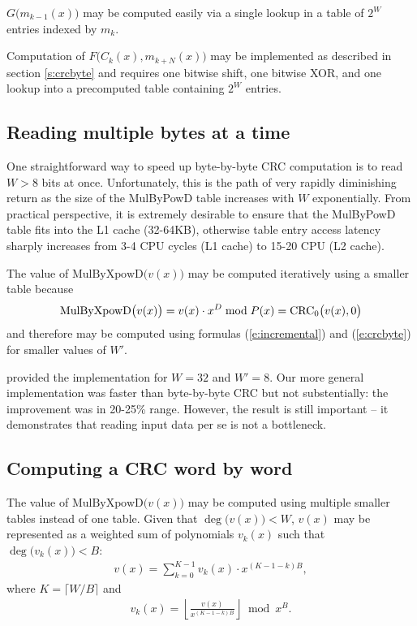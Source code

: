 \documentclass{article}
\begin{document}
$G\bigl(m_{k-1}(x)\bigr)$ may be computed easily via a single lookup
in a table of $2^W$ entries indexed by $m_k$.

Computation of $F\bigl(C_k(x), m_{k+N}(x)\bigr)$ may be implemented as
described in section \ref{s:crcbyte} and requires one bitwise shift, one
bitwise XOR, and one lookup into a precomputed table containing $2^W$
entries.


\subsection{Reading multiple bytes at a time} \label{s:crcbyteword}

One straightforward way to speed up byte-by-byte CRC computation is to read
$W > 8$ bits at once. Unfortunately, this is the path of very rapidly
diminishing return as the size of the MulByPowD table increases with $W$
exponentially. From practical perspective, it is extremely desirable to
ensure that the MulByPowD table fits into the L1 cache (32-64KB), otherwise
table entry access latency sharply increases from 3-4 CPU cycles (L1 cache)
to 15-20 CPU (L2 cache).

The value of $\mbox{MulByXpowD}\bigl(v(x)\bigr)$ may be computed
iteratively using a smaller table because
  \begin{align}
    \mbox{MulByXpowD}\bigl(v(x)\bigr)
      = v(x) \cdot x^D \bmod P(x)
      = {\rm CRC}_0\bigl(v(x), 0\bigr) \label{e:readwordatonce}
  \end{align}
and therefore may be computed using formulas (\ref{e:incremental}) and
(\ref{e:crcbyte}) for smaller values of $W'$.

\cite{Black93} provided the implementation for $W=32$ and $W'=8$. Our more
general implementation was faster than byte-by-byte CRC but not
substentially: the improvement was in 20-25\% range. However, the result is
still important -- it demonstrates that reading input data per se is not a
bottleneck.


\subsection{Computing a CRC word by word} \label{s:crcword}

The value of $\mbox{MulByXpowD}\bigl(v(x)\bigr)$ may be computed using
multiple smaller tables instead of one table. Given that
$\deg\bigl(v(x)\bigr) < W$, $v(x)$ may be represented as a weighted
sum of polynomials $v_k(x)$ such that $\deg\bigl(v_k(x)\bigr) < B$:
  \begin{align*}
    v(x) = \sum_{k=0}^{K-1} v_k(x) \cdot x^{(K-1-k)B},
  \end{align*}
where $K = \lceil W/B \rceil$ and
  \begin{align*}
    v_k(x) = \left\lfloor \frac{v(x)}{x^{(K-1-k)B}} \right\rfloor \bmod x^B.
  \end{align*}
\end{document}
